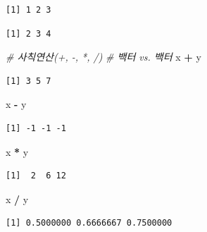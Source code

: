 \documentclass[
  11pt,
]{krantz}
\newenvironment{Shaded}{\begin{snugshade}}{\end{snugshade}}
\newcommand{\CommentTok}[1]{\textcolor[rgb]{0.37,0.37,0.37}{\textit{#1}}}
\newcommand{\NormalTok}[1]{#1}
\newcommand{\OperatorTok}[1]{\textcolor[rgb]{0.43,0.43,0.43}{\textbf{#1}}}
\newcommand{\StringTok}[1]{\textcolor[rgb]{0.5,0.5,0.5}{#1}}
\begin{document}
\begin{verbatim}
[1] 1 2 3
\end{verbatim}

\begin{verbatim}
[1] 2 3 4
\end{verbatim}

\begin{Shaded}
\begin{Highlighting}[]
\CommentTok{# 사칙연산(+, -, *, /)}
\CommentTok{# 백터 vs. 백터}
\NormalTok{x }\OperatorTok{+}\StringTok{ }\NormalTok{y}
\end{Highlighting}
\end{Shaded}

\begin{verbatim}
[1] 3 5 7
\end{verbatim}

\begin{Shaded}
\begin{Highlighting}[]
\NormalTok{x }\OperatorTok{-}\StringTok{ }\NormalTok{y}
\end{Highlighting}
\end{Shaded}

\begin{verbatim}
[1] -1 -1 -1
\end{verbatim}

\begin{Shaded}
\begin{Highlighting}[]
\NormalTok{x }\OperatorTok{*}\StringTok{ }\NormalTok{y}
\end{Highlighting}
\end{Shaded}

\begin{verbatim}
[1]  2  6 12
\end{verbatim}

\begin{Shaded}
\begin{Highlighting}[]
\NormalTok{x }\OperatorTok{/}\StringTok{ }\NormalTok{y}
\end{Highlighting}
\end{Shaded}

\begin{verbatim}
[1] 0.5000000 0.6666667 0.7500000
\end{verbatim}

\begin{Shaded}
\end{Shaded}
\end{document}
